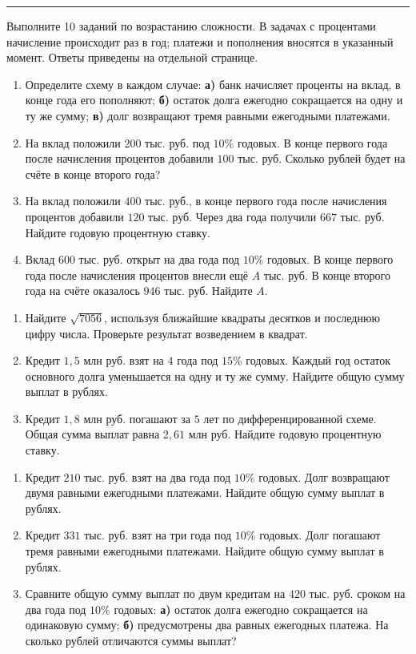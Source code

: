\documentclass[a4paper,12pt]{article}
\newcommand{\microhead}[1]{\vspace{2mm}{\large\textcolor{darkaccent}{\bfseries #1}}\par\vspace{1mm}}
\newcommand{\topic}[1]{\vspace{4mm}{\Large\textcolor{darkaccent}{\bfseries #1}}\par\vspace{1mm}\textcolor{rulegray}{\rule{\linewidth}{0.35pt}}\vspace{2mm}}
\begin{document}
\begingroup
{}
\topic{7. Тренировочный блок: Путь А}
\textcolor{mutedgray}{Выполните 10 заданий по возрастанию сложности. В задачах с процентами начисление происходит раз в год; платежи и пополнения вносятся в указанный момент. Ответы приведены на отдельной странице.}

\microhead{Базовый уровень}
\begin{enumerate}[label=\textbf{\arabic*.}]
\item Определите схему в каждом случае: \textbf{а)} банк начисляет проценты на вклад, в конце года его пополняют; \textbf{б)} остаток долга ежегодно сокращается на одну и ту же сумму; \textbf{в)} долг возвращают тремя равными ежегодными платежами.
\item На вклад положили $200$ тыс. руб. под $10\%$ годовых. В конце первого года после начисления процентов добавили $100$ тыс. руб. Сколько рублей будет на счёте в конце второго года?
\item На вклад положили $400$ тыс. руб., в конце первого года после начисления процентов добавили $120$ тыс. руб. Через два года получили $667$ тыс. руб. Найдите годовую процентную ставку.
\item Вклад $600$ тыс. руб. открыт на два года под $10\%$ годовых. В конце первого года после начисления процентов внесли ещё $A$ тыс. руб. В конце второго года на счёте оказалось $946$ тыс. руб. Найдите $A$.
\end{enumerate}
\microhead{Средний уровень}
\begin{enumerate}[label=\textbf{\arabic*.},start=5]
\item Найдите $\sqrt{7056}$, используя ближайшие квадраты десятков и последнюю цифру числа. Проверьте результат возведением в квадрат.
\item Кредит $1{,}5$ млн руб. взят на $4$ года под $15\%$ годовых. Каждый год остаток основного долга уменьшается на одну и ту же сумму. Найдите общую сумму выплат в рублях.
\item Кредит $1{,}8$ млн руб. погашают за $5$ лет по дифференцированной схеме. Общая сумма выплат равна $2{,}61$ млн руб. Найдите годовую процентную ставку.
\end{enumerate}
\microhead{Повышенный уровень}
\begin{enumerate}[label=\textbf{\arabic*.},start=8]
\item Кредит $210$ тыс. руб. взят на два года под $10\%$ годовых. Долг возвращают двумя равными ежегодными платежами. Найдите общую сумму выплат в рублях.
\item Кредит $331$ тыс. руб. взят на три года под $10\%$ годовых. Долг погашают тремя равными ежегодными платежами. Найдите общую сумму выплат в рублях.
\item Сравните общую сумму выплат по двум кредитам на $420$ тыс. руб. сроком на два года под $10\%$ годовых: \textbf{а)} остаток долга ежегодно сокращается на одинаковую сумму; \textbf{б)} предусмотрены два равных ежегодных платежа. На сколько рублей отличаются суммы выплат?
\end{enumerate}
\endgroup
\clearpage
\end{document}
